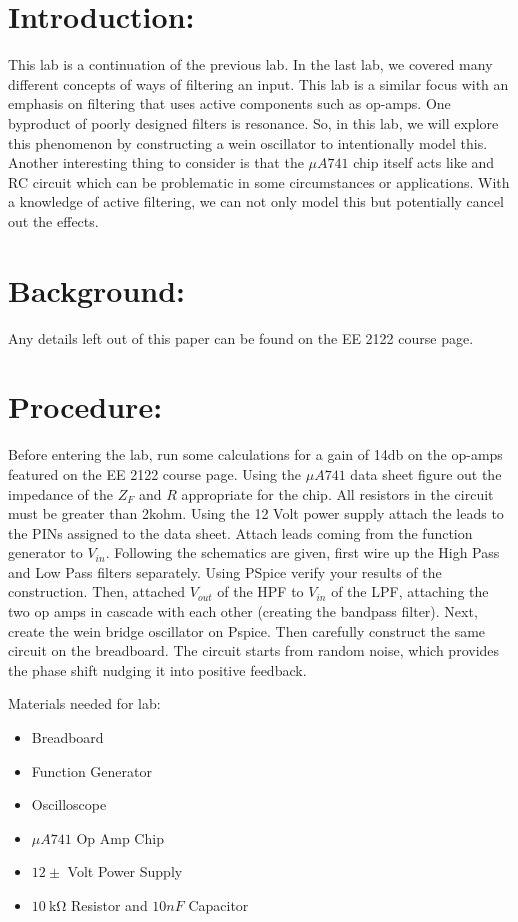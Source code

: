 \documentclass[10pt,a4paper]{article}
\begin{document}
\section*{Introduction:}
This lab is a continuation of the previous lab. In the last lab, we covered many different concepts of ways of filtering an input. This lab is a similar focus with an emphasis on filtering that uses active components such as op-amps. One byproduct of poorly designed filters is resonance. So, in this lab, we will explore this phenomenon by constructing a wein oscillator to intentionally model this. Another interesting thing to consider is that the $\mu A741$ chip itself acts like and RC circuit which can be problematic in some circumstances or applications. With a knowledge of active filtering, we can not only model this but potentially cancel out the effects.
\section*{Background:}
Any details left out of this paper can be found on the EE 2122 course page.
\section*{Procedure:}
Before entering the lab, run some calculations for a gain of 14db on the op-amps featured on the EE 2122 course page. Using the $\mu A741$ data sheet figure out the impedance of the $Z_{F}$ and $R$ appropriate for the chip. All resistors in the circuit must be greater than 2kohm. Using the 12 Volt power supply attach the leads to the PINs assigned to the data sheet. Attach leads coming from the function generator to $V_{in}$. Following the schematics are given, first wire up the High Pass and Low Pass filters separately. Using PSpice verify your results of the construction. Then, attached $V_{out}$ of the HPF to $V_{in}$ of the LPF, attaching the two op amps in cascade with each other (creating the bandpass filter).  Next, create the wein bridge oscillator on Pspice. Then carefully construct the same circuit on the breadboard. The circuit starts from random noise, which provides the phase shift nudging it into positive feedback.


\begin{flushleft}
Materials needed for lab:
\end{flushleft}
\begin{itemize}
\item Breadboard
\item Function Generator 
\item Oscilloscope
\item $\mu A741$ Op Amp Chip 
\item $12\pm$ Volt Power Supply 
\item  $\SI{10}{\kohm}$ Resistor and $10nF$ Capacitor 
\end{itemize}
\end{document}
